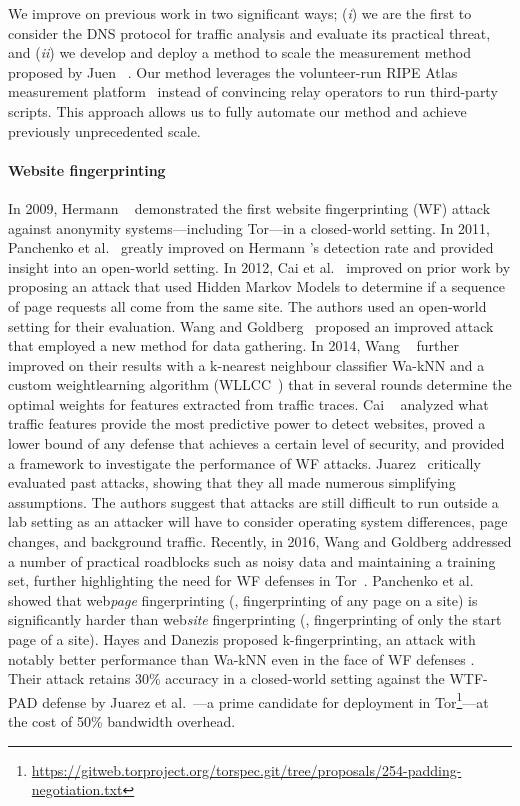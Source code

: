 We improve on previous work in two significant ways; (\emph{i}) we are the first
to consider the DNS protocol for traffic analysis and evaluate its practical
threat, and (\emph{ii}) we develop and deploy a method to scale the measurement
method proposed by Juen \ea~\cite{Juen2015a}.  Our method leverages the
volunteer-run RIPE Atlas measurement platform~\cite{atlas} instead of convincing
relay operators to run third-party scripts.  This approach allows us to fully
automate our method and achieve previously unprecedented scale.

\paragraph{Website fingerprinting}
In 2009, Hermann \ea~\cite{Hermann2009a} demonstrated the first website
fingerprinting (WF) attack against anonymity systems---including Tor---in a
closed-world setting.  In 2011, Panchenko et al.~\cite{Panchenko2011a} greatly
improved on Hermann \ea's detection rate and provided insight into an open-world
setting.  In 2012, Cai et al.~\cite{Cai2012a} improved on prior work by
proposing an attack that used Hidden Markov Models to determine if a sequence of
page requests all come from the same site.  The authors used an open-world
setting for their evaluation.  Wang and Goldberg~\cite{Wang2013a} proposed an
improved attack that employed a new method for data gathering.  In 2014, Wang
\ea~\cite{Wang2014a} further improved on their results with a
k-nearest neighbour classifier Wa-kNN and a custom weightlearning algorithm
(WLLCC~\cite{WangThesis}) that in several rounds determine the optimal weights
for features extracted from traffic traces.
Cai \ea~\cite{Cai2014b}
analyzed what traffic features provide the most predictive power to detect
websites, proved a lower bound of any defense that achieves a certain level of
security, and provided a framework to investigate the performance of
WF attacks.  Juarez~\cite{Juarez2014a} critically evaluated past
attacks, showing that they all made numerous simplifying
assumptions.  The authors suggest that attacks are still
difficult to run outside a lab setting as an attacker will have to consider
operating system differences, page changes, and background traffic.
Recently, in 2016, Wang and Goldberg addressed a number of practical
roadblocks such as noisy data and maintaining a training set,
further highlighting the need for WF defenses in Tor~\cite{taoianreally}.
Panchenko et al.~\cite{Panchenko2016a} showed that
web\emph{page} fingerprinting (\ie, fingerprinting of any page on a site) is
significantly harder than web\emph{site} fingerprinting (\ie,
fingerprinting of only the start page of a site).
Hayes and Danezis proposed k-fingerprinting, an attack with
notably better performance than Wa-kNN even in the face of
WF defenses \cite{kfingerprinting}. Their attack retains 30\% accuracy in a
closed-world setting against the WTF-PAD defense by
Juarez et al.~\cite{DBLP:journals/corr/JuarezIPDW15}---a prime candidate for
deployment in Tor\footnote{\url{https://gitweb.torproject.org/torspec.git/tree/proposals/254-padding-negotiation.txt}}---at
the cost of 50\% bandwidth overhead.

